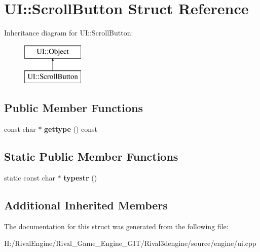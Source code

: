 \hypertarget{struct_u_i_1_1_scroll_button}{}\section{UI\+:\+:Scroll\+Button Struct Reference}
\label{struct_u_i_1_1_scroll_button}
Inheritance diagram for UI\+:\+:Scroll\+Button\+:\begin{figure}[H]
\begin{center}
\leavevmode
\includegraphics[height=2.000000cm]{struct_u_i_1_1_scroll_button}
\end{center}
\end{figure}
\subsection*{Public Member Functions}
\begin{DoxyCompactItemize}
\item 
\mbox{\label{struct_u_i_1_1_scroll_button_a3c6ba176c5ba342a690a545493b0ae78}} 
const char $\ast$ {\bfseries gettype} () const
\end{DoxyCompactItemize}
\subsection*{Static Public Member Functions}
\begin{DoxyCompactItemize}
\item 
\mbox{\label{struct_u_i_1_1_scroll_button_a6b5e217cd9628c12c589c2b2fc69e6e3}} 
static const char $\ast$ {\bfseries typestr} ()
\end{DoxyCompactItemize}
\subsection*{Additional Inherited Members}


The documentation for this struct was generated from the following file\+:\begin{DoxyCompactItemize}
\item 
H\+:/\+Rival\+Engine/\+Rival\+\_\+\+Game\+\_\+\+Engine\+\_\+\+G\+I\+T/\+Rival3dengine/source/engine/ui.\+cpp\end{DoxyCompactItemize}
